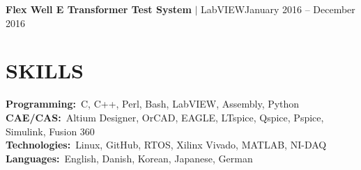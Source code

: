 \documentclass[11pt,hidelinks]{article}
\begin{document}
          \resumeItemListEnd
          \vspace{-15pt}
\resumeProjectHeading
         {\textbf{\large Flex Well E Transformer Test System} $|$ \large{LabVIEW}}{January 2016 -- December 2016}
         \resumeItemListStart
         \resumeItemListEnd 
          
    \resumeSubHeadingListEnd
\vspace{-12pt}

%

\section{SKILLS}
 \begin{itemize}[leftmargin=0.15in, label={}]
    \small{\item{
     \textbf{\normalsize{Programming:}}{~\normalsize{C, C++, Perl, Bash, LabVIEW, Assembly, Python}} \\
     \textbf{\normalsize{CAE/CAS:}}{~\normalsize{Altium Designer, OrCAD, EAGLE, LTspice, Qspice, Pspice, Simulink, Fusion 360}} \\
     \textbf{\normalsize{Technologies:}}{~\normalsize{Linux, GitHub, RTOS, Xilinx Vivado, MATLAB, NI-DAQ}} \\
     \textbf{\normalsize{Languages:}}{~\normalsize{English, Danish, Korean, Japanese, German}} \\
    }}
 \end{itemize}
 \vspace{-15pt}


 
\end{document}
